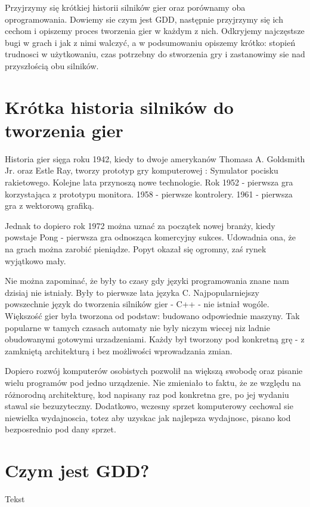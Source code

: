 \documentclass[brudnopis]{xmgr}
\begin{document}
Przyjrzymy się krótkiej historii silników gier oraz porównamy oba oprogramowania. Dowiemy sie czym jest GDD, następnie przyjrzymy się ich cechom i opiszemy proces tworzenia gier w każdym z nich. Odkryjemy najczęstsze bugi w grach i jak z nimi walczyć, a w podsumowaniu opiszemy krótko: stopień trudnosci w użytkowaniu, czas potrzebny do stworzenia gry i zastanowimy sie nad przyszłością obu silników.

\chapter{Krótka historia silników do tworzenia gier}

Historia gier sięga roku 1942, kiedy to dwoje amerykanów Thomasa A. Goldsmith Jr. oraz Estle Ray, tworzy prototyp gry komputerowej : Symulator pocisku rakietowego. Kolejne lata przynoszą nowe technologie. Rok 1952 - pierwsza gra korzystająca z prototypu monitora. 1958 - pierwsze kontrolery. 1961 - pierwsza gra z wektorową grafiką.

Jednak to dopiero rok 1972 można uznać za początek nowej branży, kiedy powstaje Pong - pierwsza gra odnosząca komercyjny sukces. Udowadnia ona, że na grach można zarobić pieniądze. Popyt okazał się ogromny, zaś rynek wyjątkowo mały.

Nie można zapominać, że były to czasy gdy języki programowania znane nam dzisiaj nie istniały. Były to pierwsze lata języka C. Najpopularniejszy powszechnie język do tworzenia silników gier - C++ - nie istniał wogóle. Większość gier była tworzona od podstaw: budowano odpowiednie maszyny. Tak popularne w tamych czasach automaty nie byly niczym wiecej niz ladnie obudowanymi gotowymi urzadzeniami. Każdy był tworzony pod konkretną grę - z zamkniętą architekturą i bez możliwości wprowadzania zmian.

Dopiero rozwój komputerów osobistych pozwolił na większą swobodę oraz pisanie wielu programów pod jedno urządzenie. Nie zmieniało to faktu, że ze względu na różnorodną architekturę, kod napisany raz pod konkretna gre, po jej wydaniu stawal sie bezuzyteczny. Dodatkowo, wczesny sprzet komputerowy cechowal sie niewielka wydajnoscia, totez aby uzyskac jak najlepsza wydajnosc, pisano kod bezposrednio pod dany sprzet.

\chapter{Czym jest GDD?}

Tekst
\end{document}
